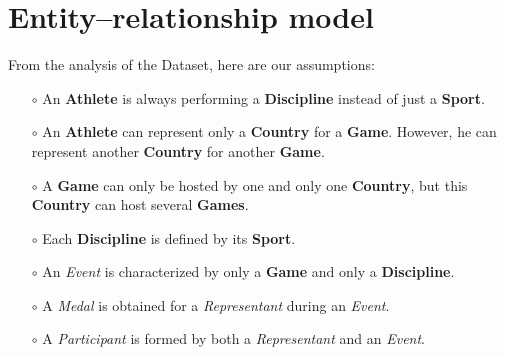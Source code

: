 %
%
%
%

\chapter{Entity–relationship model}

\begin{center}
\end{center}

From the analysis of the Dataset, here are our assumptions:

\begin{itemize}
	\item[$\circ$] An \textbf{Athlete} is always performing a \textbf{Discipline} instead of just a \textbf{Sport}.
	\item[$\circ$] An \textbf{Athlete} can represent only a \textbf{Country} for a \textbf{Game}. However, he can represent another \textbf{Country} for another \textbf{Game}.
	\item[$\circ$] A \textbf{Game} can only be hosted by one and only one \textbf{Country}, but this \textbf{Country} can host several \textbf{Games}.
	\item[$\circ$] Each \textbf{Discipline} is defined by its \textbf{Sport}.
	\item[$\circ$] An \textit{Event} is characterized by only a \textbf{Game} and only a \textbf{Discipline}.
	\item[$\circ$] A \textit{Medal} is obtained for a \textit{Representant} during an \textit{Event}.
	\item[$\circ$] A \textit{Participant} is formed by both a \textit{Representant} and an \textit{Event}.
\end{itemize}



